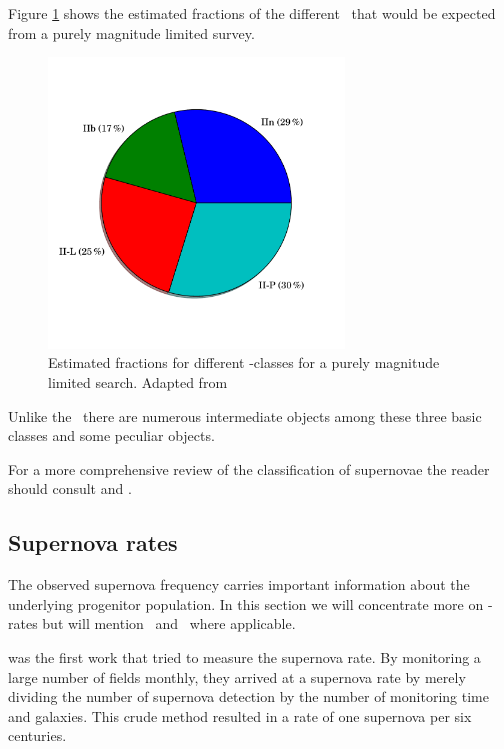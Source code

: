Figure \ref{fig:ii_fracs} shows the estimated fractions of the different \sneii\ that would be expected from a purely magnitude limited survey.

\begin{figure}[htbp] %
   \centering
   \includegraphics[width=0.7\textwidth, trim=0 2.5cm 0 0cm]{chapter_intro/plots/plot_ii_fracs.pdf} 
   \caption{Estimated fractions for different \snii-classes for a purely magnitude limited search. Adapted from \citet{2011MNRAS.412.1441L}}
   \label{fig:ii_fracs}
\end{figure}


Unlike the \sneia\ there are numerous intermediate objects among these three basic classes and some peculiar objects.


For a more comprehensive review of the classification of supernovae the reader should consult \citet{2003LNP...598...21T} and \citet{2007AIPC..937..187T}.

\subsection{Supernova rates}
\label{sec:sn_rates}
The observed supernova frequency carries important information about the underlying progenitor population. In this section we will concentrate more on \sneia-rates but will mention \sneii\ and \sneibc\ where applicable.

\citet{1938ApJ....88..529Z} was the first work that tried to measure the supernova rate. By monitoring a large number of fields monthly, they arrived at a supernova rate by merely dividing the number of supernova detection by the number of monitoring time and galaxies. This crude method resulted in a rate of one supernova per six centuries. 

